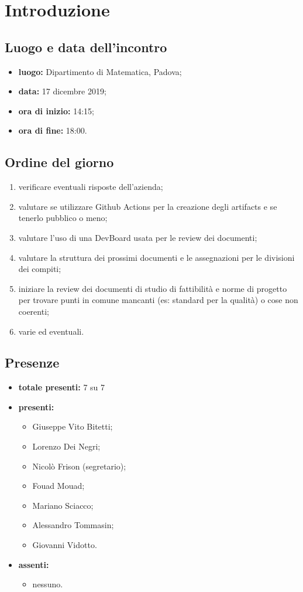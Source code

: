 \section*{Introduzione}

\subsection*{Luogo e data dell'incontro}
	\begin{itemize}
		\item \textbf{luogo:} Dipartimento di Matematica, Padova;
		\item \textbf{data:} 17 dicembre 2019;
		\item \textbf{ora di inizio:} 14:15;
		\item \textbf{ora di fine:} 18:00.
	\end{itemize}

\subsection*{Ordine del giorno}
	\begin{enumerate}
		\item verificare eventuali risposte dell'azienda;
		\item valutare se utilizzare Github Actions per la creazione degli artifacts e se tenerlo pubblico o meno;
		\item valutare l'uso di una DevBoard usata per le review dei documenti;
		\item valutare la struttura dei prossimi documenti e le assegnazioni per le divisioni dei compiti;
		\item iniziare la review dei documenti di studio di fattibilità e norme di progetto per trovare punti in comune mancanti (es: standard per la qualità) o cose non coerenti;
		\item varie ed eventuali.
	\end{enumerate}

\subsection*{Presenze}
	\begin{itemize}
		\item \textbf{totale presenti:} 7 su 7
		\item \textbf{presenti: }
			\begin{itemize}			
				\item Giuseppe Vito Bitetti;
				\item Lorenzo Dei Negri;
				\item Nicolò Frison (segretario);
				\item Fouad Mouad;
				\item Mariano Sciacco;
				\item Alessandro Tommasin;
				\item Giovanni Vidotto.
			\end{itemize}
		\item \textbf{assenti: } 
			\begin{itemize}	
				\item nessuno.
			\end{itemize}
	\end{itemize}


